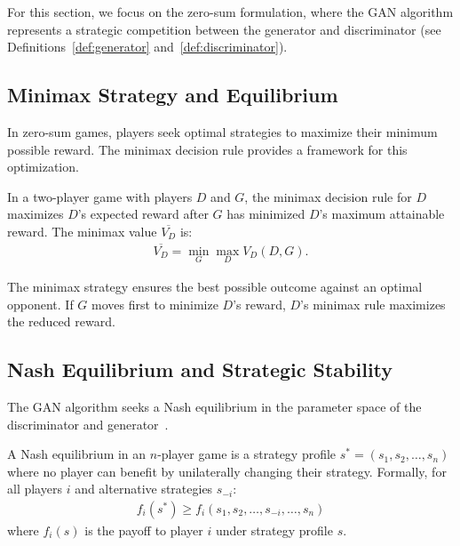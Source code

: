 \begin{remark}
  For this section, we focus on the zero-sum formulation, where the GAN algorithm represents a strategic competition between the generator and discriminator (see Definitions~\ref{def:generator} and~\ref{def:discriminator}).
\end{remark}

\subsection{Minimax Strategy and Equilibrium}

In zero-sum games, players seek optimal strategies to maximize their minimum possible reward. The minimax decision rule provides a framework for this optimization.

\begin{definition}
  \label{def:minimax}
  In a two-player game with players $D$ and $G$, the \textnormal{\sffamily minimax decision rule} for $D$ maximizes $D$'s expected reward after $G$ has minimized $D$'s maximum attainable reward. The \textnormal{\sffamily minimax value} $\overline{V_D}$ is:
  \begin{align}
    \overline{V_D} = \min_{G} \max_{D} V_D(D, G).
  \end{align}
\end{definition}

The minimax strategy ensures the best possible outcome against an optimal opponent. If $G$ moves first to minimize $D$'s reward, $D$'s minimax rule maximizes the reduced reward.

\subsection{Nash Equilibrium and Strategic Stability}

The GAN algorithm seeks a Nash equilibrium in the parameter space of the discriminator and generator~\cite{ref:goodfellow-2016,ref:goodfellow-2017}.

\begin{definition}
  A \textnormal{\sffamily Nash equilibrium} in an $n$-player game is a strategy profile $s^* = (s_1, s_2, \dots, s_n)$ where no player can benefit by unilaterally changing their strategy. Formally, for all players $i$ and alternative strategies $s_{-i}$:
  \begin{align}
    f_i(s^*) \geq f_i(s_1, s_2, \dots, s_{-i}, \dots, s_n)
  \end{align}
  where $f_i(s)$ is the payoff to player $i$ under strategy profile $s$.
\end{definition}

